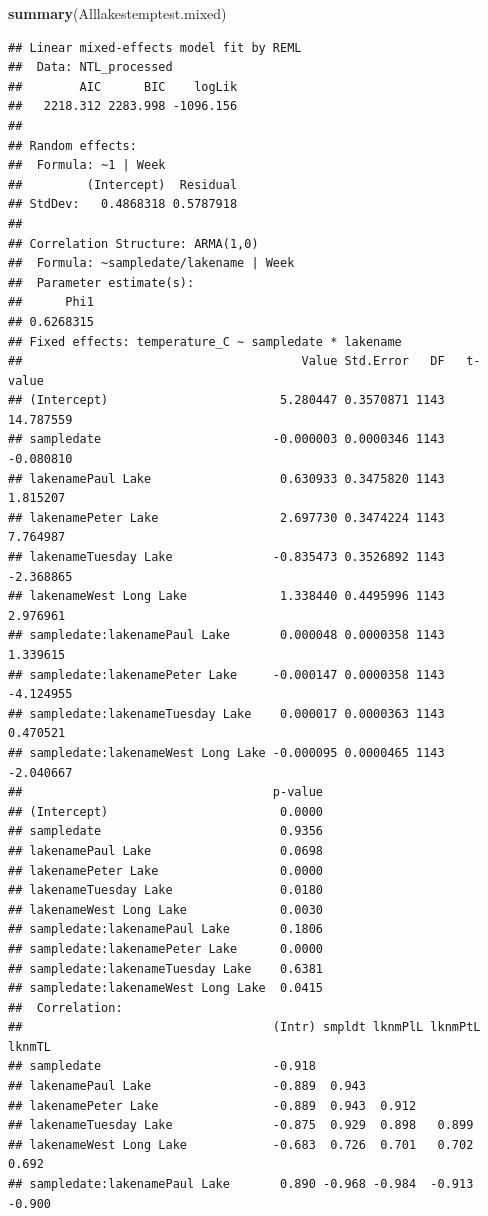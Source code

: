 \documentclass[12pt,]{article}
\newenvironment{Shaded}{\begin{snugshade}}{\end{snugshade}}
\newcommand{\KeywordTok}[1]{\textcolor[rgb]{0.13,0.29,0.53}{\textbf{#1}}}
\newcommand{\NormalTok}[1]{#1}
\begin{document}
\begin{Shaded}
\begin{Highlighting}[]
\KeywordTok{summary}\NormalTok{(Alllakestemptest.mixed)}
\end{Highlighting}
\end{Shaded}

\begin{verbatim}
## Linear mixed-effects model fit by REML
##  Data: NTL_processed 
##        AIC      BIC    logLik
##   2218.312 2283.998 -1096.156
## 
## Random effects:
##  Formula: ~1 | Week
##         (Intercept)  Residual
## StdDev:   0.4868318 0.5787918
## 
## Correlation Structure: ARMA(1,0)
##  Formula: ~sampledate/lakename | Week 
##  Parameter estimate(s):
##      Phi1 
## 0.6268315 
## Fixed effects: temperature_C ~ sampledate * lakename 
##                                       Value Std.Error   DF   t-value
## (Intercept)                        5.280447 0.3570871 1143 14.787559
## sampledate                        -0.000003 0.0000346 1143 -0.080810
## lakenamePaul Lake                  0.630933 0.3475820 1143  1.815207
## lakenamePeter Lake                 2.697730 0.3474224 1143  7.764987
## lakenameTuesday Lake              -0.835473 0.3526892 1143 -2.368865
## lakenameWest Long Lake             1.338440 0.4495996 1143  2.976961
## sampledate:lakenamePaul Lake       0.000048 0.0000358 1143  1.339615
## sampledate:lakenamePeter Lake     -0.000147 0.0000358 1143 -4.124955
## sampledate:lakenameTuesday Lake    0.000017 0.0000363 1143  0.470521
## sampledate:lakenameWest Long Lake -0.000095 0.0000465 1143 -2.040667
##                                   p-value
## (Intercept)                        0.0000
## sampledate                         0.9356
## lakenamePaul Lake                  0.0698
## lakenamePeter Lake                 0.0000
## lakenameTuesday Lake               0.0180
## lakenameWest Long Lake             0.0030
## sampledate:lakenamePaul Lake       0.1806
## sampledate:lakenamePeter Lake      0.0000
## sampledate:lakenameTuesday Lake    0.6381
## sampledate:lakenameWest Long Lake  0.0415
##  Correlation: 
##                                   (Intr) smpldt lknmPlL lknmPtL lknmTL
## sampledate                        -0.918                              
## lakenamePaul Lake                 -0.889  0.943                       
## lakenamePeter Lake                -0.889  0.943  0.912                
## lakenameTuesday Lake              -0.875  0.929  0.898   0.899        
## lakenameWest Long Lake            -0.683  0.726  0.701   0.702   0.692
## sampledate:lakenamePaul Lake       0.890 -0.968 -0.984  -0.913  -0.900

\end{verbatim}
\end{document}
